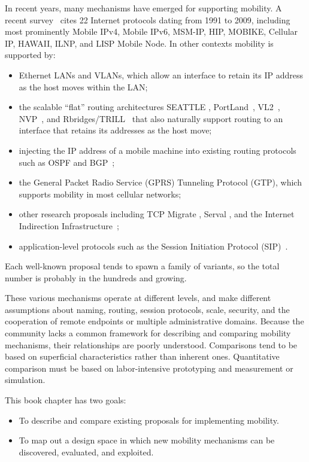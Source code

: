 In recent years, many mechanisms have emerged for supporting 
mobility.
A recent survey~\cite{rfc6301} cites 22 Internet protocols dating from 1991
to 2009, including most prominently Mobile IPv4, Mobile IPv6,
MSM-IP, HIP, MOBIKE,
Cellular IP, HAWAII,
ILNP, and LISP Mobile Node.
In other contexts mobility is supported by:
\begin{itemize}
\item
Ethernet LANs and VLANs, which allow an interface to retain its IP address 
as the host moves within the LAN;

\item 
the scalable ``flat'' routing architectures 
SEATTLE \cite{seattle}, PortLand~\cite{portland},
VL2~\cite{vl2}, NVP~\cite{nvp}, and
Rbridges/TRILL~\cite{rbridges,rfc5556}
that also naturally support routing to an interface that
retains its addresses as the host move;

\item
injecting the IP address of a mobile machine into existing routing protocols
such as OSPF and BGP~\cite{connexion,smog};

\item
the General Packet Radio Service (GPRS) Tunneling Protocol (GTP),
which supports mobility in most cellular networks;

\item
other research proposals including
TCP Migrate \cite{tcp-migrate}, Serval \cite{serval}, 
and the Internet Indirection Infrastructure~\cite{i3};

\item
application-level protocols such as 
the Session Initiation Protocol (SIP)~\cite{mobilesip}.
\end{itemize}

\noindent
Each well-known proposal tends to spawn a family of variants, so
the total number is probably in the hundreds and growing.

These various mechanisms operate at different levels, and make
different assumptions about naming, routing, session
protocols, scale, security, and the cooperation of
remote endpoints or multiple administrative domains.  
Because the
community lacks a common framework for describing and comparing
mobility mechanisms, their relationships are poorly understood.
Comparisons tend to be based on superficial characteristics rather
than inherent ones.  
Quantitative comparison must be based on
labor-intensive prototyping and measurement or simulation.

This book chapter has two goals:
\begin{itemize}
\item
To describe and compare existing proposals for implementing mobility.
\item
To map out a design space in which
new mobility mechanisms can be discovered,
evaluated, and exploited.
\end{itemize}


